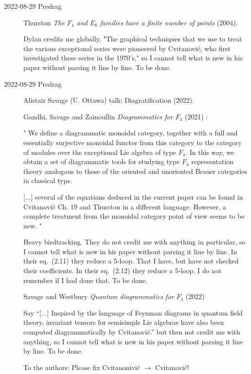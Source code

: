 \begin{description}
\item[2022-08-29 Predrag]
Thurston
{\em The {$F_4$} and {$E_6$} families have a finite number of points} (2004).

Dylan credits me globally,
"The graphical techniques that we use to treat the various exceptional
series were pioneered by Cvitanovi{\'c}, who first investigated these
series in the 1970's," so I cannot tell what is new in his paper
without parsing it line by line. To be done.

\item[2022-08-29 Predrag]
Alistair Savage (U. Ottawa) talk:
{Diagratification}  (2022).

Gandhi, Savage and Zainoullin
{\em Diagrammatics for {$F_4$}} (2021)
:

"
We define a diagrammatic monoidal category, together with a full and 
essentially surjective monoidal functor from this category to the 
category of modules over the exceptional Lie algebra of type $F_4$. In 
this way, we obtain a set of diagrammatic tools for studying type $F_4$ 
representation theory analogous to those of the oriented and unoriented 
Brauer categories in classical type. 

[...] several of the equations deduced in the current paper can be found
in Cvitanovi{\'c} Ch. 19 and Thurston in a
different language. However, a complete treatment from the monoidal
category point of view seems to be new.
"

Heavy birdtracking.
They do not credit me with anything in particular,  so I cannot tell what
is new in his paper without parsing it line by line. 
In their eq.~(2.11) they reduce a 5-loop. That I have, but have not 
checked their coefficients. 
In their eq.~(2.12) they reduce a 5-loop. I do not remember if I had 
done that. To be done.

Savage and Westbury
{\em Quantum diagrammatics for {$F_4$}}  (2022)

Say ``[...] Inspired by the language of Feynman diagrams in quantum field
theory, invariant tensors for semisimple Lie algebras have also been
computed diagrammatically by Cvitanovi{\'c}.'' but then not
credit me with anything,  so I cannot tell what is new in his paper
without parsing it line by line. To be done.

To the authors: Please fix Cvitanonivi{\'c} $\to$ Cvitanovi{\'c}!


\end{description}
